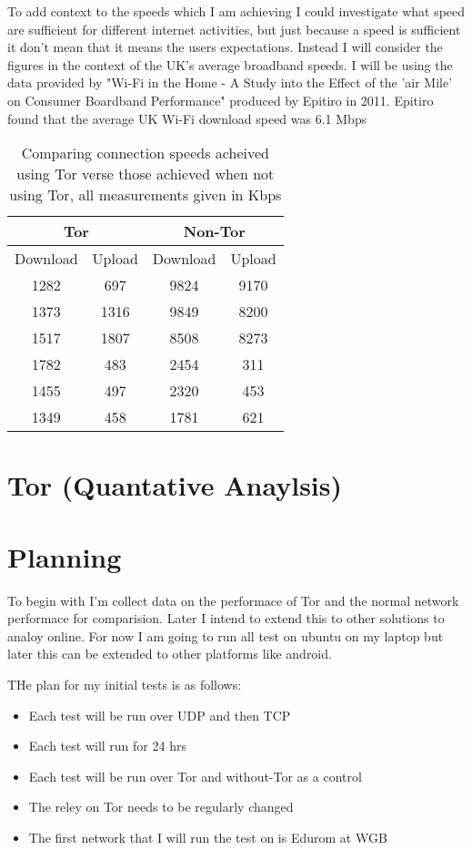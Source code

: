 \documentclass[12pt,a4paper,oneside]{article}
\begin{document}
To add context to the speeds which I am achieving I could investigate what speed are sufficient for different internet activities, but just because a speed is sufficient it don't mean that it means the users expectations. Instead I will consider the figures in the context of the UK's average broadband speeds. I will be using the data provided by "Wi-Fi in the Home - A Study into the Effect of the 'air Mile' on Consumer Boardband Performance" produced by Epitiro in 2011. Epitiro found that the average UK Wi-Fi download speed was 6.1 Mbps


\begin{table}[tbp]
\centering
\begin{tabular}{|c c|c c|}
	\hline
	\multicolumn{2}{|c|}{Tor} & \multicolumn{2}{|c|}{Non-Tor} \\
	\hline
	Download & Upload & Download & Upload \\
	\hline
	1282 & 697 & 9824 & 9170 \\
	1373 & 1316 & 9849 & 8200 \\
	1517 & 1807 & 8508 & 8273 \\
	\hline
	1782 & 483 & 2454 & 311 \\
	1455 & 497 & 2320 & 453 \\
	1349 & 458 & 1781 & 621 \\
	\hline
	
	

\end{tabular}
\caption{Comparing connection speeds acheived using Tor verse those achieved when not using Tor, all measurements given in Kbps}
\label{tab:my table on Tor connection speeds}
\end{table}



\section{Tor (Quantative Anaylsis)}

\section{Planning}
To begin with I'm collect data on the performace of Tor and the normal network performace for comparision. Later I intend to extend this to other solutions to analoy online. For now I am going to run all test on ubuntu on my laptop but later this can be extended to other platforms like android. 

THe plan for my initial tests is as follows:
\begin{itemize}
\item Each test will be run over UDP and then TCP
\item Each test will run for 24 hrs 
\item Each test will be run over Tor and without-Tor as a control
\item The reley on Tor needs to be regularly changed
\item The first network that I will run the test on is Edurom at WGB

\end{itemize}
\end{document}
